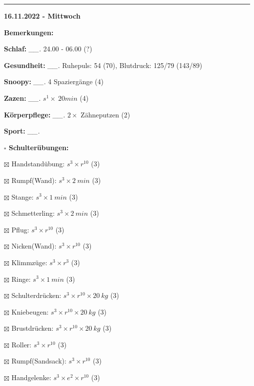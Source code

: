 \documentclass[10pt,a4paper]{article}
\newcommand\prop[1] {{\color {alizarin} {\bf #1}}}             %
\newcommand\rele[1] {{\color {english} \bf {#1}}}              %
\newcommand\mand[1] {{\color {burntorange} {\bf #1}}}          %
\newcommand\ddivide {\vskip -9pt \hrule \vskip 6pt}
\newcommand\topspace{\vskip -15pt \hskip 20pt}
\newcommand\n[1] { {\sl #1.} \hskip 5pt }
\begin{document}
\ddivide
{\rele {16.11.2022 - Mittwoch}}

\begin{mdframed}[style=daystyle]
  \begin{labeling}{{\mand {Bemerkungen:}}}
    \setlength\itemsep{-3pt}
  \item[{\mand {Schlaf:}}]       \n{\_\_} 24.00 - 06.00 (?)
  \item[{\mand {Gesundheit:}}]   \n{\_\_} Ruhepuls: 54 (70), Blutdruck: 125/79 (143/89)
  \item[{\mand {Snoopy:}}]       \n{\_\_} 4 Spaziergänge (4)
  \item[{\mand {Zazen:}}]        \n{\_\_} $s^1 \times\ 20 min$ (4)
  \item[{\mand {Körperpflege:}}] \n{\_\_} $2 \times$ Zähneputzen (2)
  \item[{\mand {Sport:}}]        \n{\_\_}
    \topspace
    \begin{minipage}{0.75\textwidth}  
      \begin{labeling}{\prop {$\square$ {Schulterübungen:}}} 
        \setlength\itemsep{-3pt}
      \item[$\boxtimes$ Handstandübung:]  $s^3 \times r^{10}$ (3)
      \item[$\boxtimes$ Rumpf(Wand):]     $s^3 \times 2\ min$ (3)
      \item[$\boxtimes$ Stange:]          $s^3 \times 1\ min$ (3)
      \item[$\boxtimes$ Schmetterling:]   $s^3 \times 2\ min$ (3)
      \item[$\boxtimes$ Pflug:]           $s^3 \times r^{10}$ (3)
      \item[$\boxtimes$ Nicken(Wand):]    $s^3 \times r^{10}$ (3)
      \item[$\boxtimes$ Klimmzüge:]       $s^3 \times r^3$ (3)
      \item[$\boxtimes$ Ringe:]           $s^3 \times 1\ min$ (3)
      \item[$\boxtimes$ Schulterdrücken:] $s^3 \times r^{10} \times 20\ kg$ (3)
      \item[$\boxtimes$ Kniebeugen:]      $s^3 \times r^{10} \times 20\ kg$ (3)
      \item[$\boxtimes$ Brustdrücken:]    $s^3 \times r^{10} \times 20\ kg$ (3)
      \item[$\boxtimes$ Roller:]          $s^3 \times r^{10}$ (3)
      \item[$\boxtimes$ Rumpf(Sandsack):] $s^3 \times r^{10}$ (3)
      \item[$\boxtimes$ Handgelenke:]     $s^3 \times e^2 \times r^{10}$ (3)

\end{labeling}
\end{minipage}
\end{labeling}
\end{mdframed}
\end{document}
